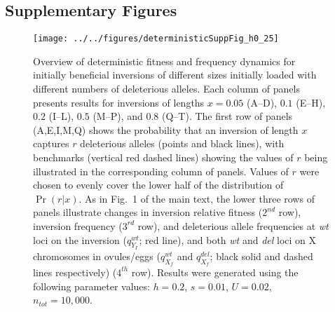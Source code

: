\documentclass{article}
\begin{document}
\begin{appendices}
\section{Supplementary Figures} \label{SuppFigs-App}
 \renewcommand{\theequation}{C\arabic{equation}}
 \setcounter{equation}{0}
 \renewcommand{\thefigure}{S\arabic{figure}}
 \setcounter{figure}{0}


 \begin{figure}[htbp]
 \centering
 \texttt{[image: ../../figures/deterministicSuppFig\_h0\_25]}
 \caption{Overview of deterministic fitness and frequency dynamics for initially beneficial inversions of different sizes initially loaded with different numbers of deleterious alleles. Each column of panels presents results for inversions of lengths $x = 0.05$ (A--D), $0.1$ (E--H), $0.2$ (I--L), $0.5$ (M--P), and $0.8$ (Q--T). The first row of panels (A,E,I,M,Q) shows the probability that an inversion of length $x$ captures $r$ deleterious alleles (points and black lines), with benchmarks (vertical red dashed lines) showing the values of $r$ being illustrated in the corresponding column of panels. Values of $r$ were chosen to evenly cover the lower half of the distribution of $\Pr(r | x)$. As in Fig.~1 of the main text, the lower three rows of panels illustrate changes in inversion relative fitness ($2^{nd}$ row), inversion frequency ($3^{rd}$ row), and deleterious allele frequencies at {\itshape wt} loci on the inversion ($q_{Y_I}^{wt}$; red line), and both {\itshape wt} and {\itshape del} loci on X chromosomes in ovules/eggs ($q_{X_f}^{wt}$ and $q_{X_f}^{del}$; black solid and dashed lines respectively) ($4^{th}$ row). Results were generated using the following parameter values: $h = 0.2$, $s = 0.01$, $U = 0.02$, $n_{tot} = 10,000$.}
 \label{fig:DetermDynamics_h0.25}
 \end{figure}



\end{appendices}
\end{document}
